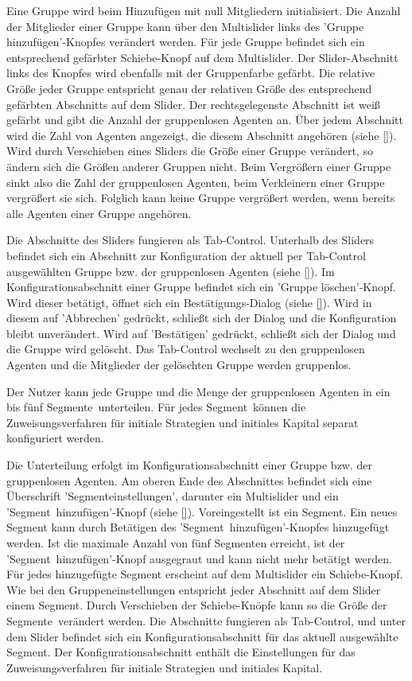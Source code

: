 \documentclass[parskip=full,11pt,twoside]{scrartcl}
\def\segment{Segment}
\def\segments{Segmente}
\begin{document}
Eine Gruppe wird beim Hinzufügen mit null Mitgliedern initialisiert. Die Anzahl der Mitglieder einer Gruppe kann über den Multislider links des 'Gruppe hinzufügen'-Knopfes verändert werden. Für jede Gruppe befindet sich ein entsprechend gefärbter Schiebe-Knopf auf dem Multislider. Der Slider-Abschnitt links des Knopfes wird ebenfalls mit der Gruppenfarbe gefärbt. Die relative Größe jeder Gruppe entspricht genau der relativen Größe des entsprechend gefärbten Abschnitts auf dem Slider. Der rechtsgelegenste Abschnitt ist weiß gefärbt und gibt die Anzahl der gruppenlosen Agenten an. Über jedem Abschnitt wird die Zahl von Agenten angezeigt, die diesem Abschnitt angehören (siehe \cref{}). Wird durch Verschieben eines Sliders die Größe einer Gruppe verändert, so ändern sich die Größen anderer Gruppen nicht. Beim Vergrößern einer Gruppe sinkt also die Zahl der gruppenlosen Agenten, beim Verkleinern einer Gruppe vergrößert sie sich. Folglich kann keine Gruppe vergrößert werden, wenn bereits alle Agenten einer Gruppe angehören.

Die Abschnitte des Sliders fungieren als Tab-Control. Unterhalb des Sliders befindet sich ein Abschnitt zur Konfiguration der aktuell per Tab-Control ausgewählten Gruppe bzw. der gruppenlosen Agenten (siehe \cref{}). Im Konfigurationsabschnitt einer Gruppe befindet sich ein 'Gruppe löschen'-Knopf. Wird dieser betätigt, öffnet sich ein Bestätigungs-Dialog (siehe \cref{}). Wird in diesem auf 'Abbrechen' gedrückt, schließt sich der Dialog und die Konfiguration bleibt unverändert. Wird auf 'Bestätigen' gedrückt, schließt sich der Dialog und die Gruppe wird gelöscht. Das Tab-Control wechselt zu den gruppenlosen Agenten und die Mitglieder der gelöschten Gruppe werden gruppenlos.

\functionality{Einteilung von Gruppen in \segments}{fnc:segments}
Der Nutzer kann jede Gruppe und die Menge der gruppenlosen Agenten in ein bis fünf \segments\ unterteilen. Für jedes \segment\ können die Zuweisungsverfahren für initiale Strategien und initiales Kapital separat konfiguriert werden.

Die Unterteilung erfolgt im Konfigurationsabschnitt einer Gruppe bzw. der gruppenlosen Agenten. Am oberen Ende des Abschnittes befindet sich eine Überschrift '\segment einstellungen', darunter ein Multislider und ein '\segment\ hinzufügen'-Knopf (siehe \cref{}). Voreingestellt ist ein Segment. Ein neues Segment kann durch Betätigen des '\segment\ hinzufügen'-Knopfes hinzugefügt werden. Ist die maximale Anzahl von fünf \segments n erreicht, ist der '\segment\ hinzufügen'-Knopf ausgegraut und kann nicht mehr betätigt werden. Für jedes hinzugefügte Segment erscheint auf dem Multislider ein Schiebe-Knopf. Wie bei den Gruppeneinstellungen entspricht jeder Abschnitt auf dem Slider einem \segment. Durch Verschieben der Schiebe-Knöpfe kann so die Größe der \segments\ verändert werden. Die Abschnitte fungieren als Tab-Control, und unter dem Slider befindet sich ein Konfigurationsabschnitt für das aktuell ausgewählte \segment. Der Konfigurationsabschnitt enthält die Einstellungen für das Zuweisungsverfahren für initiale Strategien und initiales Kapital.
\end{document}
